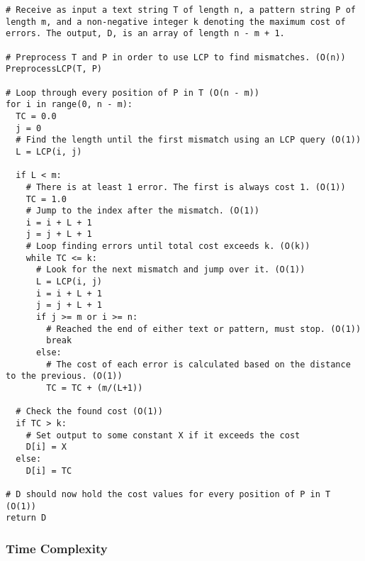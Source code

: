 \documentclass[paper=a4, fontsize=12pt]{article}
\begin{document}
\begin{lstlisting}
# Receive as input a text string T of length n, a pattern string P of length m, and a non-negative integer k denoting the maximum cost of errors. The output, D, is an array of length n - m + 1.

# Preprocess T and P in order to use LCP to find mismatches. (O(n))
PreprocessLCP(T, P)

# Loop through every position of P in T (O(n - m))
for i in range(0, n - m):
  TC = 0.0
  j = 0
  # Find the length until the first mismatch using an LCP query (O(1))
  L = LCP(i, j)

  if L < m:
    # There is at least 1 error. The first is always cost 1. (O(1))
    TC = 1.0
    # Jump to the index after the mismatch. (O(1))
    i = i + L + 1
    j = j + L + 1
    # Loop finding errors until total cost exceeds k. (O(k))
    while TC <= k:
      # Look for the next mismatch and jump over it. (O(1))
      L = LCP(i, j)
      i = i + L + 1
      j = j + L + 1
      if j >= m or i >= n:
        # Reached the end of either text or pattern, must stop. (O(1))
        break
      else:
        # The cost of each error is calculated based on the distance to the previous. (O(1))
        TC = TC + (m/(L+1))

  # Check the found cost (O(1))
  if TC > k:
    # Set output to some constant X if it exceeds the cost
    D[i] = X
  else:
    D[i] = TC

# D should now hold the cost values for every position of P in T (O(1))
return D
\end{lstlisting}

\subsubsection{Time Complexity}
\end{document}
